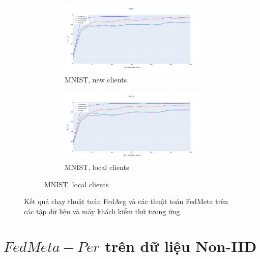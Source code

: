 \begin{figure}
    \begin{subfigure}{\textwidth}
        \centering
        \begin{subfigure}{.5\textwidth}
            \centering
            \includegraphics[width=\linewidth]{./images/mnist_meta_new.png}
            \caption{MNIST, new clients}
            \label{fig:mnist_meta_new}
        \end{subfigure}%
        \begin{subfigure}{.5\textwidth}
            \centering
            \includegraphics[width=\linewidth]{./images/mnist_meta_old.png}
            \caption{MNIST, local clients}
            \label{fig:mnist_meta_old}
        \end{subfigure}
    \end{subfigure}
    \caption{Kết quả chạy thuật toán FedAvg và các thuật toán FedMeta trên các tập dữ liệu và máy khách kiểm thử tương ứng}
    \label{fig:fedmeta_acc}
\end{figure}

\section{$FedMeta-Per$ trên dữ liệu Non-IID}

